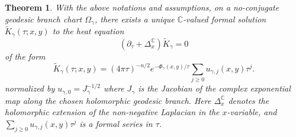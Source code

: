 \documentclass[11pt]{amsart}
\theoremstyle{plain}
\newtheorem{thm}{Theorem}[section]
\theoremstyle{definition}
\newcommand{\C}{\mathbb{C}}
\begin{document}
\begin{thm}\label{thm:heat-kernel-expansion-complex-geodesic}
With the above notations and assumptions, {on a no-conjugate geodesic branch chart} $\Omega_{\gamma}$, there exists a unique $\C$-valued formal solution $\widetilde{K}_\gamma(\tau;x,y)$ to the heat equation 
\[(\partial_{\tau}+\Delta_x^{\C})\widetilde{K}_{\gamma}=0\]
of the form
\begin{equation}\label{eq:formal-expansion-gamma}
\widetilde{K}_\gamma(\tau;x,y)=(4\pi \tau)^{-n/2}
e^{-\Phi_\gamma(x,y)/\tau}\sum_{j\geq 0}u_{\gamma,j}(x,y)\tau^j.    
\end{equation}
normalized by $u_{\gamma,0}=J_\gamma^{-1/2}$ where $J_\gamma$ is the Jacobian of the complex exponential
map along the chosen holomorphic geodesic branch. 
Here $\Delta_x^{\mathbb C}$ denotes
the holomorphic extension of the non-negative Laplacian in the $x$-variable, and $\sum\limits_{j\geq 0}u_{\gamma,j}(x,y)\tau^j$ is a formal series in $\tau$. 
\end{thm}
\end{document}
